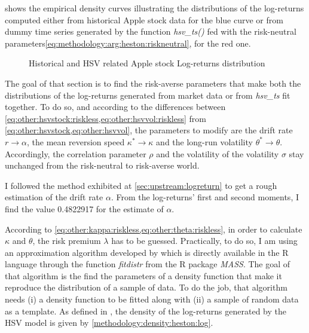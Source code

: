 \documentclass[12pt]{report}
\begin{document}
 shows the empirical density curves illustrating the distributions of the log-returns computed either from historical Apple stock data for the blue curve or from dummy time series generated by the function \textit{hsv\_ts()} fed with the risk-neutral parameters\ref{eq:methodology:arg:heston:riskneutral}, for the red one.


\begin{figure}[ht]
  \centering
  
  \caption{Historical and HSV related Apple stock Log-returns distribution}
  \label{p:methodology:density:aapl:heston:riskneutral}
\end{figure}


The goal of that section is to find the risk-averse parameters that make both the distributions of the log-returns generated from market data or from \textit{hsv\_ts} fit together.
To do so, and according to the differences between \cref{eq:other:hsvstock:riskless,eq:other:hsvvol:riskless} from \cref{eq:other:hsvstock,eq:other:hsvvol}, the parameters to modify are the drift rate $r \to \alpha$, the mean reversion speed $\kappa^{*} \to \kappa$ and the long-run volatility $\theta^* \to \theta$.
Accordingly, the correlation parameter $\rho$ and the volatility of the volatility $\sigma$ stay unchanged from the risk-neutral to risk-averse world.

I followed the method exhibited at \cref{sec:upstream:logreturn} to get a rough estimation of the drift rate $\alpha$. From the log-returns' first and second moments, I find the value 0.4822917 for the estimate of $\alpha$.

According to \cref{eq:other:kappa:riskless,eq:other:theta:riskless}, in order to  calculate $\kappa$ and $\theta$, the risk premium $\lambda$ has to be guessed.
Practically, to do so, I am using an approximation algorithm developed by \citet{MASS} which is directly available in the R language through the function \textit{fitdistr} from the R package \textit{MASS}. 
The goal of that algorithm is the find the parameters of a density function that make it reproduce the distribution of a sample of data.
To do the job, that algorithm needs (i) a density function to be fitted along with (ii) a sample of random data as a template.
As defined in \citet{Adrian}, the density of the log-returns generated by the HSV model is given by \cref{methodology:density:heston:log}.
\end{document}
